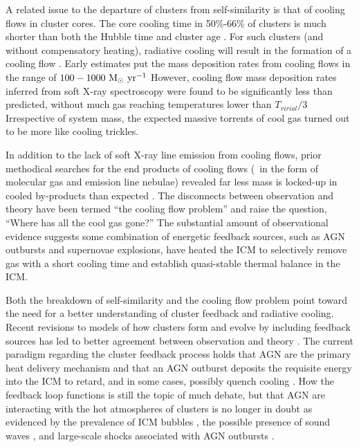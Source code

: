 \documentclass[12pt,preprint]{aastex}
\begin{document}
A related issue to the departure of clusters from self-similarity is
that of cooling flows in cluster cores. The core cooling time in
50\%-66\% of clusters is much shorter than both the Hubble time and
cluster age \citep{1984ApJ...285....1S, 1992MNRAS.258..177E, white97,
  1998MNRAS.298..416P, 2005MNRAS.359.1481B}. For such clusters (and
without compensatory heating), radiative cooling will result in the
formation of a cooling flow \citep[see][for a
  review]{fabiancfreview}. Early estimates put the mass deposition
rates from cooling flows in the range of $100-1000 \mathrm{~M_{\odot}} \mathrm{\mbox{\ensuremath{\mathrm{~yr}}}^{-1}}$
\citep[\eg][]{1984ApJ...276...38J, 1994MNRAS.270L...1E,
  1998MNRAS.298..416P} However, cooling flow mass deposition rates
inferred from soft X-ray spectroscopy were found to be significantly
less than predicted, without much gas reaching temperatures lower than
$T_{virial}/3$ \citep{tamura01, peterson01, peterson03,
  2004A&A...413..415K} Irrespective of system mass, the expected
massive torrents of cool gas turned out to be more like cooling
trickles.

In addition to the lack of soft X-ray line emission from cooling
flows, prior methodical searches for the end products of cooling flows
(\ie\ in the form of molecular gas and emission line nebulae) revealed
far less mass is locked-up in cooled by-products than expected
\citep{heckman89, mcnamara90, odea94, voit95}. The disconnects between
observation and theory have been termed ``the cooling flow problem''
and raise the question, ``Where has all the cool gas gone?'' The
substantial amount of observational evidence suggests some combination
of energetic feedback sources, such as AGN outbursts and supernovae
explosions, have heated the ICM to selectively remove gas with a short
cooling time and establish quasi-stable thermal balance in the ICM.

Both the breakdown of self-similarity and the cooling flow problem
point toward the need for a better understanding of cluster feedback
and radiative cooling. Recent revisions to models of how clusters form
and evolve by including feedback sources has led to better agreement
between observation and theory \citep{bower06, croton06, saro06,
  bower08}. The current paradigm regarding the cluster feedback
process holds that AGN are the primary heat delivery mechanism and
that an AGN outburst deposits the requisite energy into the ICM to
retard, and in some cases, possibly quench cooling \citep[see][for a
  review]{mcnamrev}. How the feedback loop functions is still the
topic of much debate, but that AGN are interacting with the hot
atmospheres of clusters is no longer in doubt as evidenced by the
prevalence of ICM bubbles \citep[\eg][]{birzan04,dunn08}, the possible
presence of sound waves \citep{2003MNRAS.344L..43F,
  2008arXiv0808.2384S}, and large-scale shocks associated with AGN
outbursts \citep{2005ApJ...635..894F, ms0735, 2005ApJ...628..629N}.
\end{document}
